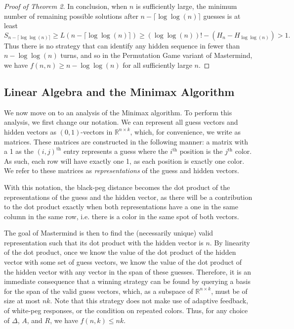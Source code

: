 \documentclass[12pt, a4paper]{article}
\newcommand{\R}{\mathbb{R}}           %
\begin{document}
\begin{proof}[Proof of Theorem 2]
 	In conclusion, when $n$ is sufficiently large, the minimum number of remaining
	possible solutions after $n - \lceil \log\log(n) \rceil$ guesses is at least
		\begin{equation*}
		S_{n - \lceil \log\log(n) \rceil} \geq L(n - \lceil \log\log(n) \rceil)
		 \ge (\log\log(n))! - (H_n - H_{\log\log(n)})
		 > 1.
		\end{equation*}
	Thus there is no strategy that can identify any hidden sequence in fewer than $n-\log\log(n)$ turns, and so in the Permutation Game variant of Mastermind, we have $f(n, n)\ge n - \log\log(n)$ for all sufficiently large $n$.
	\end{proof}

\subsection{Linear Algebra and the Minimax Algorithm}
We now move on to an analysis of the Minimax algorithm. To perform this analysis, we first change our notation. We can represent all guess vectors and hidden vectors as $(0,1)$-vectors in $\R^{n\times k}$, which, for convenience, we write as matrices. These matrices are constructed in the following manner: a matrix with a 1 as the $(i,j)^\text{th}$ entry represents a guess where the $i^\text{th}$ position is the $j^\text{th}$ color. As such, each row will have exactly one 1, as each position is exactly one color. We refer to these matrices as \textit{representations} of the guess and hidden vectors.

With this notation, the black-peg distance becomes the dot product of the representations of the guess and the hidden vector, as there will be a contribution to the dot product exactly when both representations have a one in the same column in the same row, i.e. there is a color in the same spot of both vectors. 

The goal of Mastermind is then to find the (necessarily unique) valid representation such that its dot product with the hidden vector is $n$. By linearity of the dot product, once we know the value of the dot product of the hidden vector with some set of guess vectors, we know the value of the dot product of the hidden vector with any vector in the span of these guesses. Therefore, it is an immediate consequence that a winning strategy can be found by querying a basis for the span of the valid guess vectors, which, as a subspace of $\R^{n\times k}$, must be of size at most $nk$. Note that this strategy does not make use of adaptive feedback, of white-peg responses, or the condition on repeated colors. Thus, for any choice of $\Delta$, $A$, and $R$, we have $f(n,k) \leq nk$.
\end{document}
